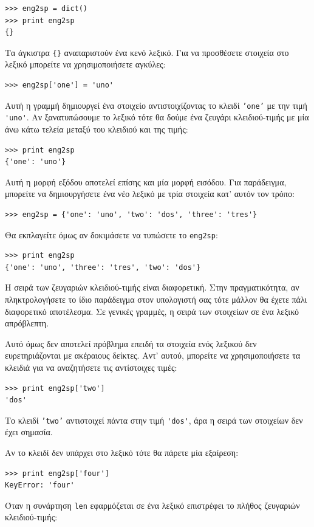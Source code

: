 \documentclass[10pt]{book}
\begin{document}
\begin{verbatim}
>>> eng2sp = dict()
>>> print eng2sp
{}
\end{verbatim}

Τα άγκιστρα \verb"{}" αναπαριστούν ένα κενό λεξικό. Για να προσθέσετε στοιχεία στο λεξικό μπορείτε να χρησιμοποιήσετε αγκύλες:

\begin{verbatim}
>>> eng2sp['one'] = 'uno'
\end{verbatim}
%
Αυτή η γραμμή δημιουργεί ένα στοιχείο αντιστοιχίζοντας το κλειδί {\tt 'one'}
με την τιμή \verb"'uno'". Αν ξανατυπώσουμε το λεξικό τότε θα δούμε ένα ζευγάρι κλειδιού-τιμής με μία άνω κάτω τελεία μεταξύ του κλειδιού και της τιμής:

\begin{verbatim}
>>> print eng2sp
{'one': 'uno'}
\end{verbatim}
%
Αυτή η μορφή εξόδου αποτελεί επίσης και μία μορφή εισόδου. Για παράδειγμα, μπορείτε να δημιουργήσετε ένα νέο λεξικό με τρία στοιχεία κατ' αυτόν τον τρόπο:

\begin{verbatim}
>>> eng2sp = {'one': 'uno', 'two': 'dos', 'three': 'tres'}
\end{verbatim}
%
Θα εκπλαγείτε όμως αν δοκιμάσετε να τυπώσετε το {\tt eng2sp}:

\begin{verbatim}
>>> print eng2sp
{'one': 'uno', 'three': 'tres', 'two': 'dos'}
\end{verbatim}
%
Η σειρά των ζευγαριών κλειδιού-τιμής είναι διαφορετική. Στην πραγματικότητα, αν πληκτρολογήσετε το ίδιο παράδειγμα στον υπολογιστή σας τότε μάλλον θα έχετε πάλι διαφορετικό αποτέλεσμα. Σε γενικές γραμμές, η σειρά των στοιχείων σε ένα λεξικό απρόβλεπτη. 

Αυτό όμως δεν αποτελεί πρόβλημα επειδή τα στοιχεία ενός λεξικού δεν ευρετηριάζονται με ακέραιους δείκτες. Αντ' αυτού, μπορείτε να χρησιμοποιήσετε τα κλειδιά για να αναζητήσετε τις αντίστοιχες τιμές:

\begin{verbatim}
>>> print eng2sp['two']
'dos'
\end{verbatim}
%
Το κλειδί {\tt 'two'} αντιστοιχεί πάντα στην τιμή \verb"'dos'", άρα η σειρά των στοιχείων δεν έχει σημασία.

Αν το κλειδί δεν υπάρχει στο λεξικό τότε θα πάρετε μία εξαίρεση:

\begin{verbatim}
>>> print eng2sp['four']
KeyError: 'four'
\end{verbatim}
%
Όταν η συνάρτηση {\tt len} εφαρμόζεται σε ένα λεξικό επιστρέφει το πλήθος ζευγαριών κλειδιού-τιμής:
\end{document}
